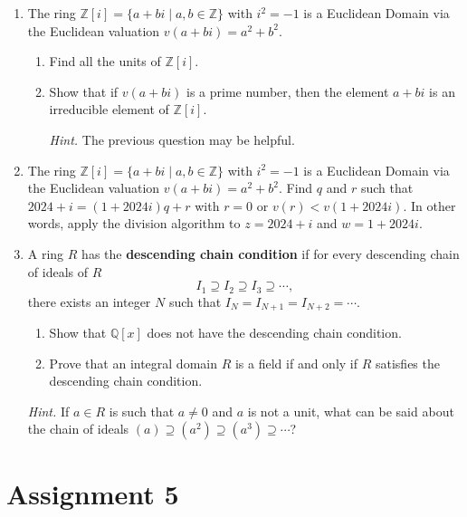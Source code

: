 \begin{enumerate}[label={\sffamily\bfseries\color{main}\arabic*.}]
	\item The ring $\mathbb Z[i]=\{a+bi\mid a,b\in\mathbb Z\}$ with $i^2=-1$ is a Euclidean Domain via the Euclidean valuation $v(a+bi)=a^2+b^2$.
	\begin{enumerate}
		\item Find all the units of $\mathbb Z[i]$.
		\item Show that if $v(a+bi)$ is a prime number, then the element $a+bi$ is an irreducible element of $\mathbb Z[i]$.

		{\footnotesize\textit{\color{main}Hint.} The previous question may be helpful.\par}
	\end{enumerate}

	\item The ring $\mathbb Z[i]=\{a+bi\mid a,b\in\mathbb Z\}$ with $i^2=-1$ is a Euclidean Domain via the Euclidean valuation $v(a+bi)=a^2+b^2$. Find $q$ and $r$ such that $2024+i=(1+2024i)q+r$ with $r=0$ or $v(r)<v(1+2024i)$. In other words, apply the division algorithm to $z=2024+i$ and $w=1+2024i$.

	\item A ring $R$ has the \textbf{descending chain condition} if for every descending chain of ideals of $R$
	$$I_1\supseteq I_2\supseteq I_3\supseteq \cdots,$$
	there exists an integer $N$ such that $I_N=I_{N+1}=I_{N+2}=\cdots$.
	\begin{enumerate}
		\item Show that $\mathbb Q[x]$ does not have the descending chain condition.
		\item Prove that an integral domain $R$ is a field if and only if $R$ satisfies the descending chain condition.
	\end{enumerate}

	{\footnotesize\textit{\color{main}Hint.} If $a\in R$ is such that $a\neq 0$ and $a$ is not a unit, what can be said about the chain of ideals $(a)\supseteq(a^2)\supseteq(a^3)\supseteq\cdots$?\par}
\end{enumerate}

\vfill\pagebreak

\section*{Assignment 5}

